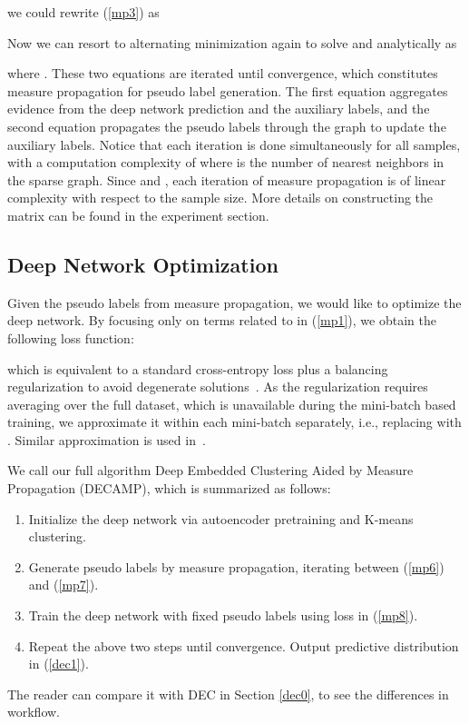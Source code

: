 \documentclass[letterpaper]{article}
\begin{document}
we could rewrite (\ref{mp3}) as 

Now we can resort to alternating minimization again to solve  and  analytically as
 
where . These two equations are iterated until convergence, which constitutes measure propagation for pseudo label generation. The first equation aggregates evidence from the deep network prediction and the auxiliary labels, and the second equation propagates the pseudo labels through the graph to update the auxiliary labels. Notice that each iteration is done simultaneously for all samples, with a computation complexity of  where  is the number of nearest neighbors in the sparse graph. Since  and , each iteration of measure propagation is of linear complexity with respect to the sample size. More details on constructing the  matrix can be found in the experiment section.

\subsection{Deep Network Optimization}
Given the pseudo labels  from measure propagation, we would like to optimize the deep network. By focusing only on terms related to  in (\ref{mp1}), we obtain the following loss function:

which is equivalent to a standard cross-entropy loss plus a balancing regularization to avoid degenerate solutions~\cite{depict}. As the regularization requires averaging over the full dataset, which is unavailable during the mini-batch based training, we approximate it within each mini-batch separately, i.e., replacing  with . Similar approximation is used in~\cite{imsat}.

We call our full algorithm Deep Embedded Clustering Aided by Measure Propagation (DECAMP), which is summarized as follows:
\begin{enumerate}
     \item Initialize the deep network via autoencoder pretraining and K-means clustering.
     \item Generate pseudo labels by measure propagation, iterating between (\ref{mp6}) and (\ref{mp7}).
     \item Train the deep network with fixed pseudo labels using loss in (\ref{mp8}).
     \item Repeat the above two steps until convergence. Output predictive distribution in (\ref{dec1}).
\end{enumerate}
The reader can compare it with DEC in Section \ref{dec0}, to see the differences in workflow.
\end{document}
